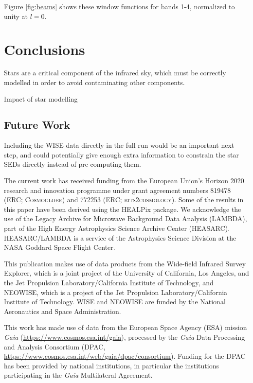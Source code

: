 \documentclass{aa}
\begin{document}
Figure \ref{fig:beams} shows these window functions for bands 1-4, normalized to unity at $l=0$. 


\section{Conclusions}
\label{sec:conclusions}

Stars are a critical component of the infrared sky, which must be correctly modelled in order to avoid contaminating other components. 

Impact of star modelling

\subsection{Future Work}

Including the WISE data directly in the full run would be an important next step, and could potentially give enough extra information to constrain the star SEDs directly instead of pre-computing them. 




\begin{acknowledgements}
 The current work has received funding from the European
  Union’s Horizon 2020 research and innovation programme under grant
  agreement numbers 819478 (ERC; \textsc{Cosmoglobe}) and 772253 (ERC;
  \textsc{bits2cosmology}). Some of the results in this paper have been derived using the HEALPix \citep{healpix} package.
  We acknowledge the use of the Legacy Archive for Microwave Background Data
  Analysis (LAMBDA), part of the High Energy Astrophysics Science Archive Center
  (HEASARC). HEASARC/LAMBDA is a service of the Astrophysics Science Division at
  the NASA Goddard Space Flight Center.  
  
   This publication makes use of data products from the Wide-field Infrared Survey Explorer, which is a joint project of the University of California, Los Angeles, and the Jet Propulsion Laboratory/California Institute of Technology, and NEOWISE, which is a project of the Jet Propulsion Laboratory/California Institute of Technology. WISE and NEOWISE are funded by the National Aeronautics and Space Administration.
   
   This work has made use of data from the European Space Agency (ESA) mission
{\it Gaia} (\url{https://www.cosmos.esa.int/gaia}), processed by the {\it Gaia}
Data Processing and Analysis Consortium (DPAC,
\url{https://www.cosmos.esa.int/web/gaia/dpac/consortium}). Funding for the DPAC
has been provided by national institutions, in particular the institutions
participating in the {\it Gaia} Multilateral Agreement.
\end{acknowledgements}


%



\end{document}
